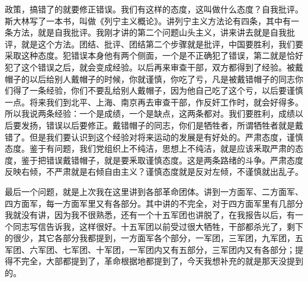 政策，搞错了的就要修正错误。我们有这样的态度，这叫做什么态度？自我批评。斯大林写了一本书，叫做《列宁主义概论》。讲列宁主义方法论有四条，其中有一条方法，就是自我批评。我刚才讲的第二个问题山头主义，讲来讲去就是自我批评，就是这个方法。团结、批评、团结第二个步骤就是批评，中国要胜利，我们要采取这种态度。犯错误本身他有两个侧面，一个是不正确犯了错误，第二就是恰好犯了这个错误之后，就会变成经验。以后再来审查干部，双方都得到了经验。被戴帽子的以后给别人戴帽子的时候，你就谨慎，你吃了亏，凡是被戴错帽子的同志你们得了一条经验，你们不要乱给别人戴帽子，因为他自己吃了这个亏，以后要谨慎一点。将来我们到北平、上海、南京再去审查干部，作反奸工作时，就会好得多。所以我说两条经验：一个是成绩，一个是缺点，这两条都对。我们要胜利，成绩以后要发扬，错误以后要修正。戴错帽子的同志，你们是牺牲者，所谓牺牲者就是戴错了。但是我们要认识到这个经验对将来运动的发展是有好处的。严肃态度，谨慎态度。鉴于有问题，我们党组织上不纯洁，思想上不纯洁，就是应该釆取严肃的态度，鉴于把错误戴错帽子，就是要釆取谨慎态度。这是两条路绪的斗争。严肃态度反映右倾，不严肃就是右倾自由主义？谨慎态度就是反对左倾，不谨慎就出乱子。

最后一个问题，就是上次我在这里讲到各部革命团体。讲到一方面军、二方面军、四方面军，每一方面军里又有各部分。其中讲的不完全，对于四方面军里有几部分我就没有讲，因为我不很熟悉，还有一个十五军团也讲脱了，在我报告以后，有一个同志写信告诉我，这样很好。十五军团以前受过很大牺牲，干部都杀光了，剩下的很少，其它各部分我都提到，一方面军各个部分，一军团，三军团，九军团，五军团、六军团、七军团、十军团，一军团内又有五部分，三军团内又有各部分；提得不完全，大部都提到了，革命根据地都提到了，今天我想补充的就是那天没提到的。

